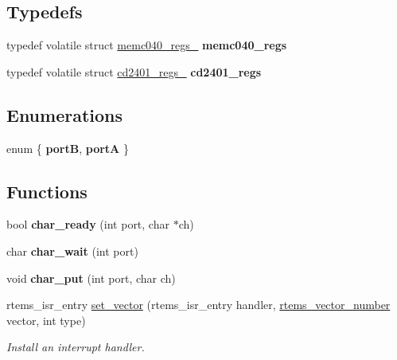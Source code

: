 \subsection*{Typedefs}
\begin{DoxyCompactItemize}
\item 
\mbox{\label{group__RTEMSBSPsM68kMVME162_ga8b81c396f9197ef40b2e5586c44490fe}} 
typedef volatile struct \mbox{\hyperlink{structmemc040__regs__}{memc040\+\_\+regs\+\_\+}} {\bfseries memc040\+\_\+regs}
\item 
\mbox{\label{group__RTEMSBSPsM68kMVME162_ga1384a41f3c1a578b08daffbf64fd9b42}} 
typedef volatile struct \mbox{\hyperlink{structcd2401__regs__}{cd2401\+\_\+regs\+\_\+}} {\bfseries cd2401\+\_\+regs}
\end{DoxyCompactItemize}
\subsection*{Enumerations}
\begin{DoxyCompactItemize}
\item 
\mbox{\label{group__RTEMSBSPsM68kMVME162_ga34df7cc7f69a8ec535eec8a524dcbaf9}} 
enum \{ {\bfseries portB}, 
{\bfseries portA}
 \}
\end{DoxyCompactItemize}
\subsection*{Functions}
\begin{DoxyCompactItemize}
\item 
\mbox{\label{group__RTEMSBSPsM68kMVME162_ga4553c6102f0c3f2ab603ba21686a4ae2}} 
bool {\bfseries char\+\_\+ready} (int port, char $\ast$ch)
\item 
\mbox{\label{group__RTEMSBSPsM68kMVME162_ga33a04b024b9791aaeb494b93b21bcde8}} 
char {\bfseries char\+\_\+wait} (int port)
\item 
\mbox{\label{group__RTEMSBSPsM68kMVME162_ga0c890aeeb46af8ce2dcc81576bf58041}} 
void {\bfseries char\+\_\+put} (int port, char ch)
\item 
rtems\+\_\+isr\+\_\+entry \mbox{\hyperlink{group__RTEMSBSPsM68kMVME162_gab3388042c56b34c40be81fd5f028d97e}{set\+\_\+vector}} (rtems\+\_\+isr\+\_\+entry handler, \mbox{\hyperlink{group__ClassicINTR_ga3e434c197d99f128e78cae4d9358bd8b}{rtems\+\_\+vector\+\_\+number}} vector, int type)
\begin{DoxyCompactList}\small\item\em Install an interrupt handler. \end{DoxyCompactList}\end{DoxyCompactItemize}

